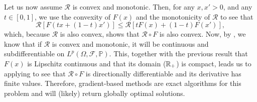 \documentclass[12pt]{article}
\begin{document}
Let us now assume $\mathcal{R}$ is convex and monotonic.
Then, for any $x,x'>0$, and any $t\in [0,1]$, we use the convexity of $F(x)$ and the monotonicity of $\mathcal{R}$ to see that \[
    \mathcal{R}[F(tx + (1-t)x')] \le \mathcal{R}[tF(x) + (1-t)F(x')]
,\] which, because $\mathcal{R}$ is also convex, shows that $\mathcal{R} \circ F$ is also convex.
Now, by \citep[Proposition~6.5]{shapiroLecturesStochasticProgramming2009}, we know that if $\mathcal{R}$ is convex and monotonic, it will be continuous and subdifferentiable on $L^{p}\left( \Omega, \mathcal{F},\mathbb{P} \right)$.
This, together with the previous result that $F(x)$ is Lipschitz continuous and that its domain ($\mathbb{R}_+$) is compact, leads us to applying \citet[Theorem~6.10]{shapiroLecturesStochasticProgramming2009} to see that $\mathcal{R} \circ F$ is directionally differentiable and its derivative has finite values.
Therefore, gradient-based methods are exact algorithms for this problem and will (likely) return globally optimal solutions.
\end{document}
